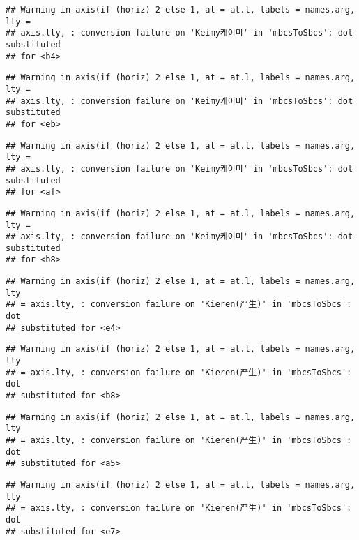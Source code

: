 \documentclass[
]{article}
\begin{document}
\begin{verbatim}
## Warning in axis(if (horiz) 2 else 1, at = at.l, labels = names.arg, lty =
## axis.lty, : conversion failure on 'Keimy케이미' in 'mbcsToSbcs': dot substituted
## for <b4>
\end{verbatim}

\begin{verbatim}
## Warning in axis(if (horiz) 2 else 1, at = at.l, labels = names.arg, lty =
## axis.lty, : conversion failure on 'Keimy케이미' in 'mbcsToSbcs': dot substituted
## for <eb>
\end{verbatim}

\begin{verbatim}
## Warning in axis(if (horiz) 2 else 1, at = at.l, labels = names.arg, lty =
## axis.lty, : conversion failure on 'Keimy케이미' in 'mbcsToSbcs': dot substituted
## for <af>
\end{verbatim}

\begin{verbatim}
## Warning in axis(if (horiz) 2 else 1, at = at.l, labels = names.arg, lty =
## axis.lty, : conversion failure on 'Keimy케이미' in 'mbcsToSbcs': dot substituted
## for <b8>
\end{verbatim}

\begin{verbatim}
## Warning in axis(if (horiz) 2 else 1, at = at.l, labels = names.arg, lty
## = axis.lty, : conversion failure on 'Kieren(严生)' in 'mbcsToSbcs': dot
## substituted for <e4>
\end{verbatim}

\begin{verbatim}
## Warning in axis(if (horiz) 2 else 1, at = at.l, labels = names.arg, lty
## = axis.lty, : conversion failure on 'Kieren(严生)' in 'mbcsToSbcs': dot
## substituted for <b8>
\end{verbatim}

\begin{verbatim}
## Warning in axis(if (horiz) 2 else 1, at = at.l, labels = names.arg, lty
## = axis.lty, : conversion failure on 'Kieren(严生)' in 'mbcsToSbcs': dot
## substituted for <a5>
\end{verbatim}

\begin{verbatim}
## Warning in axis(if (horiz) 2 else 1, at = at.l, labels = names.arg, lty
## = axis.lty, : conversion failure on 'Kieren(严生)' in 'mbcsToSbcs': dot
## substituted for <e7>
\end{verbatim}
\end{document}
